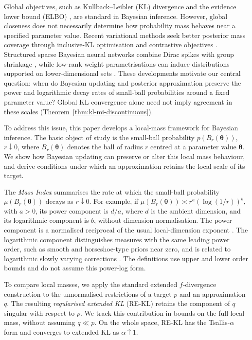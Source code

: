 \documentclass[11pt,a4paper]{article}
\newcommand{\pa}{\boldsymbol\theta}
\theoremstyle{compactplain}
\theoremstyle{compactdefinition}
\numberwithin{equation}{section}
\begin{document}
Global objectives, such as Kullback--Leibler (KL) divergence \cite{kullback1951information} and the evidence lower bound (ELBO) \cite{blei2017variational}, are standard in Bayesian inference. However, global closeness does not necessarily determine how probability mass behaves near a specified parameter value. Recent variational methods seek better posterior mass coverage through inclusive-KL optimisation \cite{mcnamara_sequential_2024} and contrastive objectives \cite{ward2025softcvi}. Structured sparse Bayesian neural networks combine Dirac spikes with group shrinkage \cite{jantre2025spike}, while low-rank weight parametrisations can induce distributions supported on lower-dimensional sets \cite{toure2026singular}. These developments motivate our central question: when do Bayesian updating and posterior approximation preserve the power and logarithmic decay rates of small-ball probabilities around a fixed parameter value? Global KL convergence alone need not imply agreement in these scales (Theorem~\ref{thm:kl-mi-discontinuous}).

To address this issue, this paper develops a local-mass framework for Bayesian inference. The basic object of study is the small-ball probability \(p(B_r(\pa))\), \(r \downarrow 0\), where \(B_r(\pa)\) denotes the ball of radius \(r\) centred at a parameter value \(\pa\). We show how Bayesian updating can preserve or alter this local mass behaviour, and derive conditions under which an approximation retains the local scale of its target.

The \emph{Mass Index} summarises the rate at which the small-ball probability \(\mu(B_r(\pa)) \)
decays as \(r\downarrow 0\). For example, if \(\mu(B_r(\pa))\asymp r^a(\log(1/r))^b\), with \(a>0\), its power component is \(d/a\), where \(d\) is the ambient dimension, and its logarithmic component is \(b\), without dimension normalisation. The power component is a normalised reciprocal of the usual local-dimension exponent \cite{heurteaux2007dimension}. The logarithmic component distinguishes measures with the same leading power order, such as smooth and horseshoe-type priors near zero, and is related to logarithmic slowly varying corrections \cite{bingham1989regular}. The definitions use upper and lower order bounds and do not assume this power-log form.

To compare local masses, we apply the standard extended \(f\)-divergence construction \cite{liero2018optimal} to the unnormalised restrictions of a target \(p\) and an approximation \(q\). The resulting \emph{regularised extended KL} (RE-KL) retains the component of \(q\) singular with respect to \(p\). We track this contribution in bounds on the full local mass, without assuming \(q\ll p\). On the whole space, RE-KL has the Tsallis-\(\alpha\) form and converges to extended KL as \(\alpha\uparrow1\).
\end{document}
